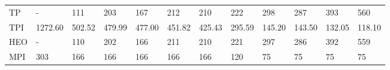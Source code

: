 \begin{table*}
{\begin{tabular}{llllllllllll}
TP       &                - &               111 &               203 &               167 &               212 &              210 &              222 &              298 &              287 &              393 &              560 \\
TPI      &          1272.60 &            502.52 &            479.99 &            477.00 &            451.82 &           425.43 &           295.59 &           145.20 &           143.50 &           132.05 &           118.10 \\
HEO      &                - &               110 &               202 &               166 &               211 &              210 &              221 &              297 &              286 &              392 &              559 \\
MPI      &              303 &               166 &               166 &               166 &               166 &              166 &              120 &               75 &               75 &               75 &               75 \\
\bottomrule
\end{tabular}}
\end{table*}
